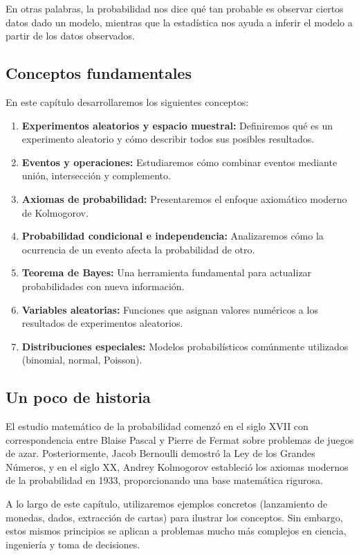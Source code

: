 En otras palabras, la probabilidad nos dice qué tan probable es observar ciertos datos dado un modelo, mientras que la estadística nos ayuda a inferir el modelo a partir de los datos observados.

\subsection*{Conceptos fundamentales}

En este capítulo desarrollaremos los siguientes conceptos:

\begin{enumerate}
	\item \textbf{Experimentos aleatorios y espacio muestral:} Definiremos qué es un experimento aleatorio y cómo describir todos sus posibles resultados.
	\item \textbf{Eventos y operaciones:} Estudiaremos cómo combinar eventos mediante unión, intersección y complemento.
	\item \textbf{Axiomas de probabilidad:} Presentaremos el enfoque axiomático moderno de Kolmogorov.
	\item \textbf{Probabilidad condicional e independencia:} Analizaremos cómo la ocurrencia de un evento afecta la probabilidad de otro.
	\item \textbf{Teorema de Bayes:} Una herramienta fundamental para actualizar probabilidades con nueva información.
	\item \textbf{Variables aleatorias:} Funciones que asignan valores numéricos a los resultados de experimentos aleatorios.
	\item \textbf{Distribuciones especiales:} Modelos probabilísticos comúnmente utilizados (binomial, normal, Poisson).
\end{enumerate}

\subsection*{Un poco de historia}

El estudio matemático de la probabilidad comenzó en el siglo XVII con correspondencia entre Blaise Pascal y Pierre de Fermat sobre problemas de juegos de azar. Posteriormente, Jacob Bernoulli demostró la Ley de los Grandes Números, y en el siglo XX, Andrey Kolmogorov estableció los axiomas modernos de la probabilidad en 1933, proporcionando una base matemática rigurosa.

\begin{observacion}
	A lo largo de este capítulo, utilizaremos ejemplos concretos (lanzamiento de monedas, dados, extracción de cartas) para ilustrar los conceptos. Sin embargo, estos mismos principios se aplican a problemas mucho más complejos en ciencia, ingeniería y toma de decisiones.
\end{observacion}
